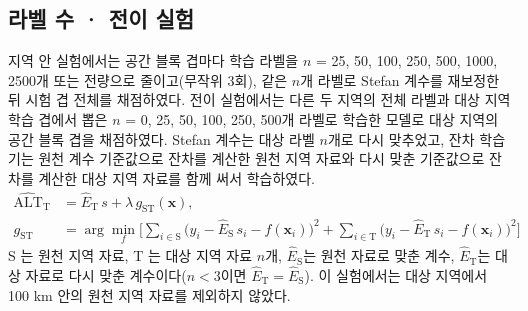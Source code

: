 \subsection{라벨 수 · 전이 실험}
지역 안 실험에서는 공간 블록 겹마다 학습 라벨을 $n$ = 25, 50, 100, 250, 500, 1000, 2500개 또는 전량으로 줄이고(무작위 3회), 같은 $n$개 라벨로 Stefan 계수를 재보정한 뒤 시험 겹 전체를 채점하였다. 전이 실험에서는 다른 두 지역의 전체 라벨과 대상 지역 학습 겹에서 뽑은 $n$ = 0, 25, 50, 100, 250, 500개 라벨로 학습한 모델로 대상 지역의 공간 블록 겹을 채점하였다. Stefan 계수는 대상 라벨 $n$개로 다시 맞추었고, 잔차 학습기는 원천 계수 기준값으로 잔차를 계산한 원천 지역 자료와 다시 맞춘 기준값으로 잔차를 계산한 대상 지역 자료를 함께 써서 학습하였다.
\begin{equation}
\begin{aligned}
\widehat{\mathrm{ALT}}_{\mathrm{T}} &= \hat{E}_{\mathrm{T}}\, s + \lambda\, g_{\mathrm{ST}}(\mathbf{x}), \\
g_{\mathrm{ST}} &= \arg\min_{f} \Big[ \sum_{i \in \mathrm{S}} \big( y_i - \hat{E}_{\mathrm{S}}\, s_i - f(\mathbf{x}_i) \big)^{2} + \sum_{i \in \mathrm{T}} \big( y_i - \hat{E}_{\mathrm{T}}\, s_i - f(\mathbf{x}_i) \big)^{2} \Big]
\end{aligned}
\label{eq:transfer}
\end{equation}
S 는 원천 지역 자료, T 는 대상 지역 자료 $n$개, $\hat{E}_{\mathrm{S}}$는 원천 자료로 맞춘 계수, $\hat{E}_{\mathrm{T}}$는 대상 자료로 다시 맞춘 계수이다($n < 3$이면 $\hat{E}_{\mathrm{T}} = \hat{E}_{\mathrm{S}}$). 이 실험에서는 대상 지역에서 100 km 안의 원천 지역 자료를 제외하지 않았다.

